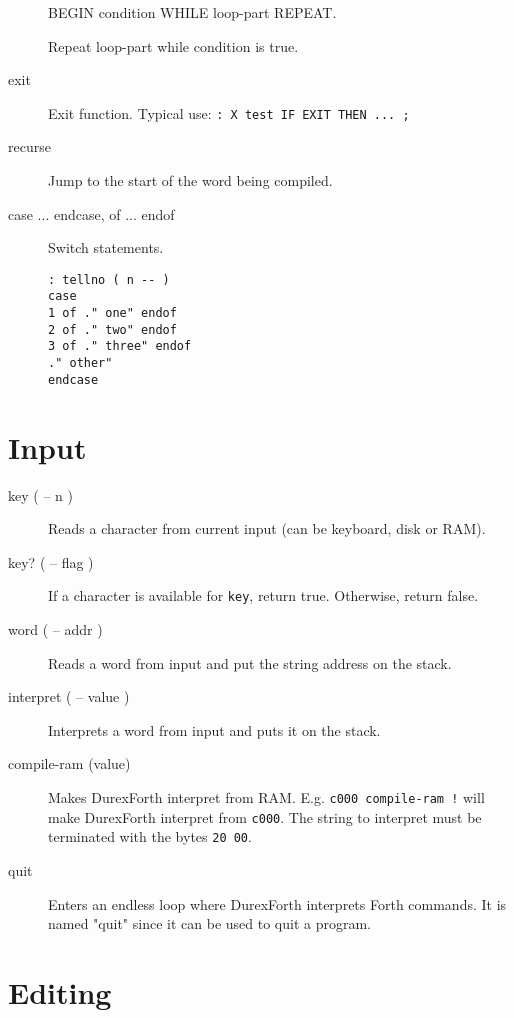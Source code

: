 \begin{description}
BEGIN condition WHILE loop-part REPEAT.

Repeat loop-part while condition is true.

\item[exit]

Exit function. Typical use: \texttt{: X test IF EXIT THEN ... ;}

\item[recurse] Jump to the start of the word being compiled.

\item[case ... endcase, of ... endof] Switch statements.

\begin{verbatim}
: tellno ( n -- )
case
1 of ." one" endof
2 of ." two" endof
3 of ." three" endof
." other"
endcase
\end{verbatim}

\end{description}

\section{Input}

\begin{description}

\item[key ( -- n )] Reads a character from current input (can be keyboard, disk or RAM).
\item[key? ( -- flag )] If a character is available for \texttt{key}, return true. Otherwise, return false.

\item[word ( -- addr )] Reads a word from input and put the string address on the stack.

\item[interpret ( -- value )] Interprets a word from input and puts it on the stack.

\item[compile-ram (value)] Makes DurexForth interpret from RAM.
E.g. \texttt{c000 compile-ram !} will make DurexForth
interpret from \texttt{c000}. The string to interpret
must be terminated with the bytes \texttt{20 00}.

\item[quit] Enters an endless loop where DurexForth interprets Forth commands. It is named "quit" since it can be used to quit a program.

\end{description}

\section{Editing}

